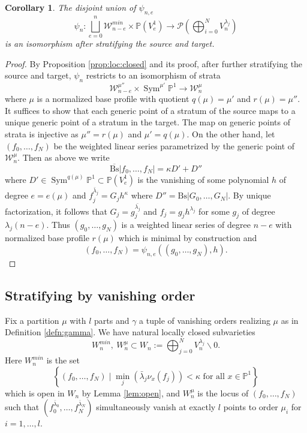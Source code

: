 \documentclass[a4paper,12pt]{amsart}
\newtheorem{cor}[thm]{Corollary}
\theoremstyle{definition}
\newcommand{\bP}{\mathbb{P}}
\newcommand{\cW}{\mathcal{W}}
\newcommand{\cP}{\mathcal{P}}
\DeclareMathOperator{\Sym}{Sym}
\renewcommand{\setminus}{\smallsetminus}
\begin{document}
	\begin{cor} \label{cor:def:strat}
		The disjoint union of $\psi_{n,e}$
		$$
		\psi_n : \bigsqcup_{e = 0}^n \cW_{n-e}^{min} \times \mathbb{P}(V_e^1) \to \cP\left(\bigoplus_{i = 0}^N V_n^{\lambda_j}\right)
		$$
		is an isomorphism after stratifying the source and target. 
	\end{cor}
	
	\begin{proof} By Proposition \ref{prop:loc:closed} and its proof, after further stratifying the source and target, $\psi_n$ restricts to an isomorphism of strata
		$$
		\cW^{\mu''}_{n-e} \times \Sym^{\mu'}\bP^1 \to \cW^{\mu}_n 
		$$
		where $\mu$ is a normalized base profile with quotient $q(\mu) = \mu'$ and $r(\mu) = \mu''$. It suffices to show that each generic point of a stratum of the source maps to a unique generic point of a stratum in the target. The map on generic points of strata is injective as $\mu'' = r(\mu)$ and $\mu' = q(\mu)$. On the other hand, let $(f_0, \ldots, f_N)$ be the weighted linear series parametrized by the generic point of $\cW_n^{\mu}$. Then as above we write 
		$$
		\overline{\mathrm{Bs}}|f_0, \ldots, f_N| = \kappa D' + D''
		$$
		where $D' \in \Sym^{q(\mu)}\bP^1 \subset \bP(V_e^1)$ is the vanishing of some polynomial $h$ of degree $e = e(\mu)$ and $f_j^{\bar{\lambda}_j} = G_j h^{\kappa}$ where $D'' = \mathrm{Bs}|G_0, \ldots, G_N|$. By unique factorization, it follows that $G_j = g_j^{\bar{\lambda_j}}$ and $f_j = g_jh^{\lambda_j}$ for some $g_j$ of degree $\lambda_j(n-e)$. Thus $(g_0, \ldots, g_N)$ is a weighted linear series of degree $n-e$ with normalized base profile $r(\mu)$ which is minimal by construction and
		$$
		(f_0, \ldots, f_N) = \psi_{n,e}((g_0, \ldots, g_N),h).
		$$
		
	\end{proof} 
	
	
	\subsection{Stratifying by vanishing order}\label{sec:str_van}
	Fix a partition $\mu$ with $l$ parts and $\gamma$ a tuple of vanishing orders realizing $\mu$ as in Definition \ref{defn:gamma}. We have natural locally closed subvarieties
	$$
	W_n^{min},\ W_n^\mu \subset W_n := \bigoplus_{j = 0}^N V_n^{\lambda_j} \setminus 0. 
	$$
	Here $W_n^{min}$ is the set
	$$
	\left\{(f_0, \ldots, f_N) \mid \min_{j}\left(\bar{\lambda}_j\nu_x(f_j)\right) < \kappa \text{ for all }x \in \bP^1\right\}
	$$
	which is open in $W_n$ by Lemma \ref{lem:open}, and $W_n^\mu$ is the locus of $(f_0, \ldots, f_N)$ such that $\left(f_0^{\bar{\lambda}_0}, \ldots, f_N^{\bar{\lambda}_N}\right)$ simultaneously vanish at exactly $l$ points to order $\mu_i$ for $i = 1, \ldots, l$. 
	
\end{document}
